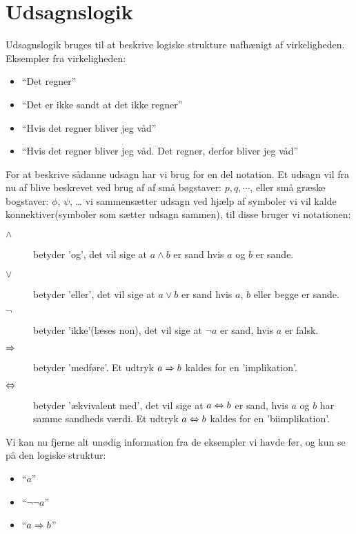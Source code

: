 \ifx\preampleIncluded\undefined
\def\startUdsagnslogik{}


\fi

\section{Udsagnslogik}
Udsagnslogik bruges til at beskrive logiske strukture uafhænigt af virkeligheden.
Eksempler fra virkeligheden:
\begin{itemize}
    \item ``Det regner''
    \item ``Det er ikke sandt at det ikke regner''
    \item ``Hvis det regner bliver jeg våd''
    \item ``Hvis det regner bliver jeg våd. Det regner, derfor bliver jeg våd''
\end{itemize}

For at beskrive sådanne udsagn har vi brug for en del notation. Et udsagn vil fra nu af blive beskrevet ved brug af af små bøgstaver: $p, q, \cdots$,
eller små græske bogstaver: $\phi$, $\psi$, \ldots
vi sammensætter udsagn ved hjælp af symboler vi vil kalde konnektiver(symboler som sætter udsagn sammen), til disse bruger vi notationen:

\begin{description}
    \item[$\land$] betyder 'og', det vil sige at $a \land b$ er sand hvis $a$ og $b$ er sande.
    \item[$\lor$] betyder 'eller', det vil sige at $a \lor b$ er sand hvis $a$, $b$ eller begge er sande.
    \item[$\lnot$] betyder 'ikke'(læses non), det vil sige at $\lnot a$ er sand, hvis $a$ er falsk.
    \item[$\Rightarrow$] betyder 'medføre'. Et udtryk $a \Rightarrow b$ kaldes for en 'implikation'.
    \item[$\Leftrightarrow$] betyder 'ækvivalent med', det vil sige at $a \Leftrightarrow b$ er sand, hvis $a$ og $b$ har samme sandheds værdi. Et udtryk $a \Leftrightarrow b$ kaldes for en 'biimplikation'.
\end{description}

Vi kan nu fjerne alt unødig information fra de eksempler vi havde før, og kun se på den logiske struktur:
\begin{itemize}
    \item ``$a$''
    \item ``$\lnot \lnot a$''
    \item ``$a \Rightarrow b$''
\end{itemize}

